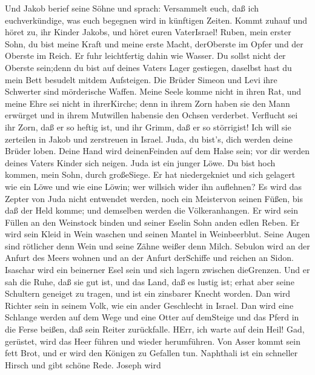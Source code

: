  Und Jakob berief seine Söhne und sprach: Versammelt euch,
daß ich euchverkündige, was euch begegnen wird in künftigen Zeiten.
 Kommt zuhauf und höret zu, ihr Kinder Jakobs, und höret
euren VaterIsrael!  Ruben, mein erster Sohn, du bist meine
Kraft und meine erste Macht, derOberste im Opfer und der Oberste im
Reich.  Er fuhr leichtfertig dahin wie Wasser. Du sollst
nicht der Oberste sein;denn du bist auf deines Vaters Lager gestiegen,
daselbst hast du mein Bett besudelt mitdem Aufsteigen.  Die
Brüder Simeon und Levi ihre Schwerter sind mörderische Waffen.
 Meine Seele komme nicht in ihren Rat, und meine Ehre sei
nicht in ihrerKirche; denn in ihrem Zorn haben sie den Mann erwürget und
in ihrem Mutwillen habensie den Ochsen verderbet.  Verflucht
sei ihr Zorn, daß er so heftig ist, und ihr Grimm, daß er so störrigist!
Ich will sie zerteilen in Jakob und zerstreuen in Israel. 
Juda, du bist's, dich werden deine Brüder loben. Deine Hand wird
deinenFeinden auf dem Halse sein; vor dir werden deines Vaters Kinder
sich neigen.  Juda ist ein junger Löwe. Du bist hoch kommen,
mein Sohn, durch großeSiege. Er hat niedergekniet und sich gelagert wie
ein Löwe und wie eine Löwin; wer willsich wider ihn auflehnen?
 Es wird das Zepter von Juda nicht entwendet werden, noch
ein Meistervon seinen Füßen, bis daß der Held komme; und demselben
werden die Völkeranhangen.  Er wird sein Füllen an den
Weinstock binden und seiner Eselin Sohn anden edlen Reben. Er wird sein
Kleid in Wein waschen und seinen Mantel in Weinbeerblut. 
Seine Augen sind rötlicher denn Wein und seine Zähne weißer denn Milch.
 Sebulon wird an der Anfurt des Meers wohnen und an der
Anfurt derSchiffe und reichen an Sidon.  Isaschar wird ein
beinerner Esel sein und sich lagern zwischen dieGrenzen. 
Und er sah die Ruhe, daß sie gut ist, und das Land, daß es lustig ist;
erhat aber seine Schultern geneiget zu tragen, und ist ein zinsbarer
Knecht worden.  Dan wird Richter sein in seinem Volk, wie
ein ander Geschlecht in Israel.  Dan wird eine Schlange
werden auf dem Wege und eine Otter auf demSteige und das Pferd in die
Ferse beißen, daß sein Reiter zurückfalle.  HErr, ich warte
auf dein Heil!  Gad, gerüstet, wird das Heer führen und
wieder herumführen.  Von Asser kommt sein fett Brot, und er
wird den Königen zu Gefallen tun.  Naphthali ist ein
schneller Hirsch und gibt schöne Rede.  Joseph wird
